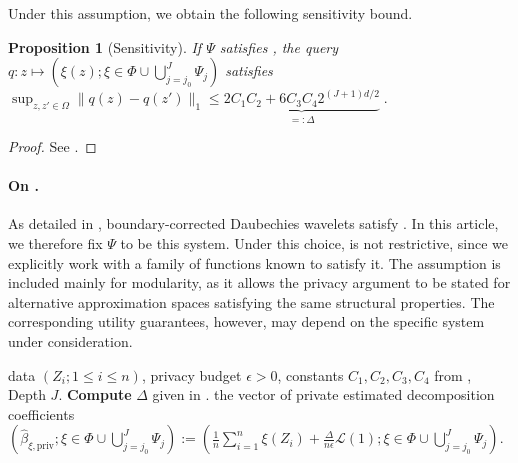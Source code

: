 \documentclass{article}
\newcommand{\1}{\mathds{1}}
\theoremstyle{plain}
\newtheorem{proposition}{Proposition}[section]
\theoremstyle{definition}
\theoremstyle{remark}
\begin{document}
Under this assumption, we obtain the following sensitivity bound.

\begin{proposition}[Sensitivity]
\label{prop:sensitivity}
    If $\Psi$ satisfies , the query
$q : z \mapsto (\xi(z); \xi \in \Phi \cup \bigcup_{j = j_0 }^{J} \Psi_j)$ satisfies
$
    \sup_{z, z' \in \Omega} \|q(z) - q(z') \|_{1} \leq \underbrace{2 C_1 C_2 + 6 C_3 C_4 2^{(J+1)d/2} }_{=: \Delta}\;.
$
\end{proposition}
\begin{proof}
    See .
\end{proof}

\paragraph{On .}
As detailed in \cite{Manole2024Plugin}, boundary-corrected Daubechies wavelets satisfy . In this article, we therefore fix $\Psi$ to be this system. Under this choice,  is not restrictive, since we explicitly work with a family of functions known to satisfy it. The assumption is included mainly for modularity, as it allows the privacy argument to be stated for alternative approximation spaces satisfying the same structural properties. The corresponding utility guarantees, however, may depend on the specific system under consideration.


\begin{algorithm}[tb]
  \caption{Querying mechanism, central DP}
  \label{alg:density_estimation_centralDP}
  \begin{algorithmic}
     data $(Z_i; 1 \leq i \leq n)$, privacy budget $\epsilon > 0$, constants $C_1, C_2, C_3, C_4$ from , Depth $J$.
    \STATE \textbf{Compute} $\Delta$ given in .
     the vector of private estimated decomposition coefficients $(\hat \beta_{\xi, \textrm{priv}}; \xi \in \Phi \cup \bigcup_{j = j_0 }^{J} \Psi_j) := (\frac{1}{n} \sum_{i=1}^n \xi(Z_i) + \frac{\Delta}{n \epsilon} \mathcal{L}(1); \xi \in \Phi \cup \bigcup_{j = j_0 }^{J} \Psi_j)$.
  \end{algorithmic}
\end{algorithm}
\end{document}
